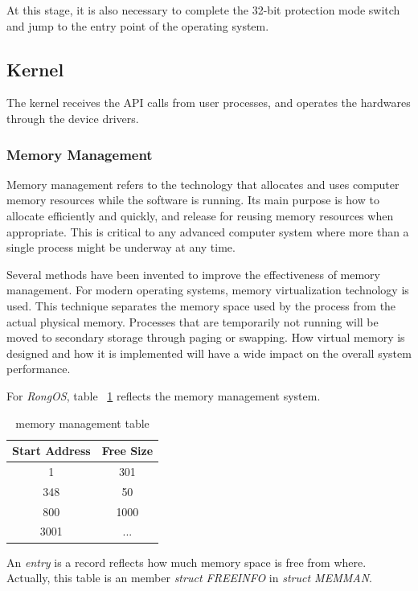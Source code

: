 \documentclass{swfcthesis}
\begin{document}
At this stage, it is also necessary to complete the 32-bit protection mode switch and jump
to the entry point of the operating system.

\subsection{Kernel}
\label{sec:kernel}

The kernel receives the API calls from user processes, and operates the
hardwares through the device drivers.

\subsubsection{Memory Management}
\label{sec:memory-management-1}

Memory management refers to the technology that allocates and uses computer memory
resources while the software is running. Its main purpose is how to allocate efficiently
and quickly, and release for reusing memory resources when appropriate. This is critical
to any advanced computer system where more than a single process might be underway at any
time.

Several methods have been invented to improve the effectiveness of memory management. For
modern operating systems, memory virtualization technology is used. This technique
separates the memory space used by the process from the actual physical memory. Processes
that are temporarily not running will be moved to secondary storage through paging or
swapping. How virtual memory is designed and how it is implemented will have a wide impact
on the overall system performance.

For \emph{RongOS}, table ~\ref{tab:memo-tab} reflects the memory management system.
\begin{table}[!ht]
  \centering
  \begin{tabular}{|c|c|}
    \hline
    Start Address & Free Size \\
    \hline
    1 & 301 \\
    \hline
    348 & 50 \\
    \hline
    800 & 1000 \\
    \hline
    3001 & ... \\
    \hline
  \end{tabular}
  \caption{memory management table}
  \label{tab:memo-tab}
\end{table}
An \emph{entry} is a record reflects how much memory space is free from where. Actually,
this table is an member \emph{struct FREEINFO} in \emph{struct MEMMAN}.
\end{document}
